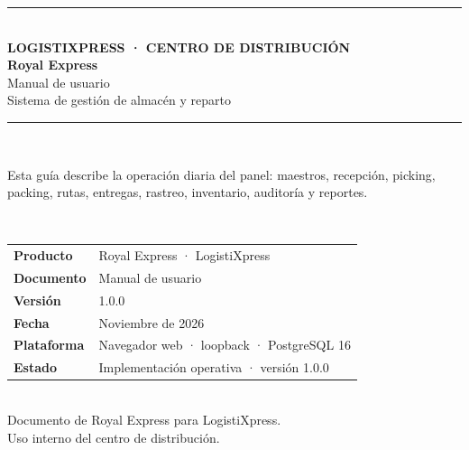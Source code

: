 \renewcommand{\docshorttitle}{Royal Express · Manual de usuario}
\renewcommand{\doctitle}{Royal Express}
\renewcommand{\docsubtitle}{Manual de usuario de Royal Express · sistema de gestión logística para LogistiXpress}
\renewcommand{\docversion}{1.0.0}
\renewcommand{\docdate}{Noviembre de 2026}
\begin{titlepage}
  \thispagestyle{empty}
  \centering
  \vspace*{1.8cm}
  {\color{RoyalOrange}\rule{\linewidth}{2.4pt}}\\[0.45cm]
  {\footnotesize\bfseries\color{RoyalGray}LOGISTIXPRESS · CENTRO DE DISTRIBUCIÓN}\\[0.35cm]
  {\Huge\bfseries\color{RoyalNavy} Royal Express}\\[0.25cm]
  {\Large\color{RoyalNavy} Manual de usuario}\\[0.1cm]
  {\large\color{RoyalGray} Sistema de gestión de almacén y reparto}\\[0.45cm]
  {\color{RoyalOrange}\rule{\linewidth}{1pt}}\\[1.4cm]
  \begin{minipage}{0.86\linewidth}
    \centering
    {\large\color{RoyalGray} Esta guía describe la operación diaria del panel: maestros, recepción,
    picking, packing, rutas, entregas, rastreo, inventario, auditoría y reportes.}
  \end{minipage}\\[2.2cm]
  \begin{tabular}{@{}ll@{}}
    \textbf{Producto} & Royal Express · LogistiXpress \\
    \textbf{Documento} & Manual de usuario \\
    \textbf{Versión} & \docversion \\
    \textbf{Fecha} & \docdate \\
    \textbf{Plataforma} & Navegador web · loopback · PostgreSQL 16 \\
    \textbf{Estado} & Implementación operativa · versión 1.0.0 \\
  \end{tabular}\\[2.4cm]
  \vfill
  {\footnotesize\color{RoyalGray} Documento de Royal Express para LogistiXpress.\\
  Uso interno del centro de distribución.}
\end{titlepage}
\tableofcontents
\newpage
